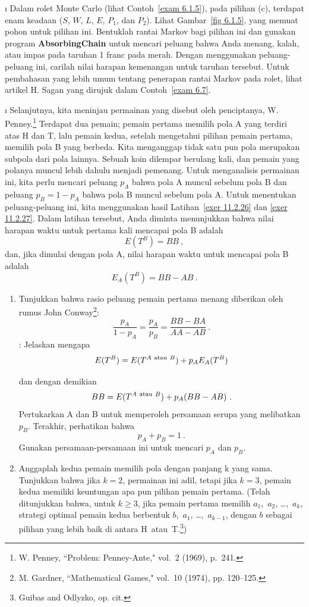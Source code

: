 \begin{LJSItem}
\i\label{exer 11.2.34} Dalam rolet Monte Carlo (lihat
Contoh~\ref{exam 6.1.5}), pada pilihan (c), terdapat enam keadaan ($S$, $W$,
$L$, $E$, $P_1$, dan $P_2$). Lihat Gambar~\ref{fig 6.1.5}, yang memuat pohon
untuk pilihan ini. Bentuklah rantai Markov bagi pilihan ini dan gunakan program
{\bf AbsorbingChain} untuk mencari peluang bahwa Anda menang, kalah, atau impas
pada taruhan 1 franc pada merah. Dengan menggunakan peluang-peluang ini, carilah
nilai harapan kemenangan untuk taruhan tersebut. Untuk pembahasan yang lebih
umum tentang penerapan rantai Markov pada rolet, lihat artikel H. Sagan yang
dirujuk dalam Contoh~\ref{exam 6.7}.

\i\label{exer 11.5.26} Selanjutnya, kita meninjau permainan yang disebut
 oleh penciptanya, W. Penney.\footnote{W. Penney, ``Problem: Penney-Ante,"  vol.~2 (1969), p.~241.} Terdapat dua
pemain; pemain pertama memilih pola A yang terdiri atas H dan T, lalu pemain
kedua, setelah mengetahui pilihan pemain pertama, memilih pola B yang berbeda.
Kita menganggap tidak satu pun pola merupakan subpola dari pola lainnya. Sebuah
koin dilempar berulang kali, dan pemain yang polanya muncul lebih dahulu menjadi
pemenang. Untuk menganalisis permainan ini, kita perlu mencari peluang $p_A$
bahwa pola A muncul sebelum pola B dan peluang $p_B = 1- p_A$ bahwa pola B
muncul sebelum pola A. Untuk menentukan peluang-peluang ini, kita menggunakan
hasil Latihan~\ref{exer 11.2.26} dan \ref{exer 11.2.27}. Dalam latihan tersebut,
Anda diminta menunjukkan bahwa nilai harapan waktu untuk pertama kali mencapai
pola B adalah
$$
E(T^B) = BB\ ,
$$
dan, jika dimulai dengan pola A, nilai harapan waktu untuk mencapai pola B adalah
$$
E_A(T^B) = BB - AB\ .
$$

\begin{enumerate}
\item Tunjukkan bahwa rasio peluang pemain pertama menang diberikan oleh rumus
John Conway\footnote{M. Gardner, ``Mathematical Games," 
 vol.~10 (1974), pp. 120--125.}:
$$
\frac{p_A}{1-p_A} = \frac{p_A}{p_B} = \frac{BB - BA}{AA - AB}\ .
$$
: Jelaskan mengapa
$$
E(T^B) = E(T^{A\ {\rm atau}\ B}) + p_A E_A(T^B)
$$

dan dengan demikian
$$
BB = E(T^{A\ {\rm atau}\ B}) + p_A (BB - AB)\ .
$$
Pertukarkan A dan B untuk memperoleh persamaan serupa yang melibatkan $p_B$.
Terakhir, perhatikan bahwa
$$
p_A + p_B = 1\ .$$
Gunakan persamaan-persamaan ini untuk mencari $p_A$ dan $p_B$.

\item Anggaplah kedua pemain memilih pola dengan panjang k yang sama. Tunjukkan
bahwa jika $k = 2$, permainan ini adil, tetapi jika $k = 3$, pemain kedua
memiliki keuntungan apa pun pilihan pemain pertama. (Telah ditunjukkan bahwa,
untuk $k \geq 3$, jika pemain pertama memilih $a_1$,~$a_2$, \ldots,~$a_k$,
strategi optimal pemain kedua berbentuk $b$,~$a_1$, \ldots,~$a_{k - 1}$, dengan
$b$ sebagai pilihan yang lebih baik di antara H~atau~T.\footnote{Guibas and
Odlyzko, op. cit.})
\end{enumerate}

\end{LJSItem}


